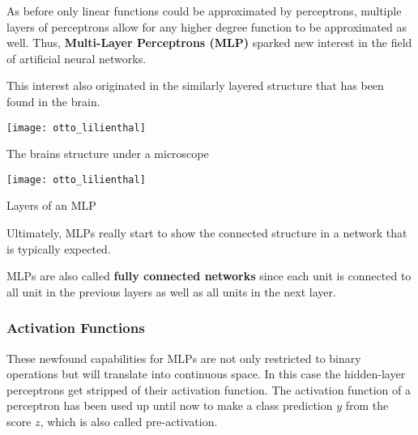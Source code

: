 
As before only linear functions could be approximated by perceptrons, multiple layers of perceptrons allow for any higher degree function to be approximated as well.
Thus, \textbf{Multi-Layer Perceptrons (MLP)} sparked new interest in the field of artificial neural networks.

This interest also originated in the similarly layered structure that has been found in the brain.
\begin{marginfigure}
    \texttt{[image: otto\_lilienthal]}
    \caption[]{The brains structure under a microscope}
\end{marginfigure}
\begin{marginfigure}
    \texttt{[image: otto\_lilienthal]}
    \caption[]{Layers of an MLP}
\end{marginfigure}
Ultimately, MLPs really start to show the connected structure in a network that is typically expected.

MLPs are also called \textbf{fully connected networks} since each unit is connected to all unit in the previous layers as well as all units in the next layer.



\subsubsection{Activation Functions}
These newfound capabilities for MLPs are not only restricted to binary operations but will translate into continuous space.
In this case the hidden-layer perceptrons get stripped of their activation function.
The activation function of a perceptron has been used up until now to make a class prediction $y$ from the score $z$, which is also called pre-activation.

